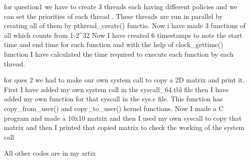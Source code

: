 for question1
we have to create 3 threads each having different policies and we can set the priorities of each thread . These threads are run in parallel by creating all of them by pthread_create() functio.
Now i have made 3 functions of all which counts from 1-2^32
Now I have created 6 timestamps to note the start
time and end time for each function and with the help of clock_gettime() function I have
calculated the time required to execute each function by each thread.


for ques 2
we had to make our own system call to copy a 2D matrix and print it. First I have
added my own system call in the syscall_64.tbl file then I have added my own function for that
syscall in the sys.c file. This function has copy_from_user() and copy_to_user() kernel functions.
Now I made a C program and made a 10x10 matrix and then I used my own syscall to copy that
matrix and then I printed that copied matrix to check the working of the system call


All other codes are in my artix
